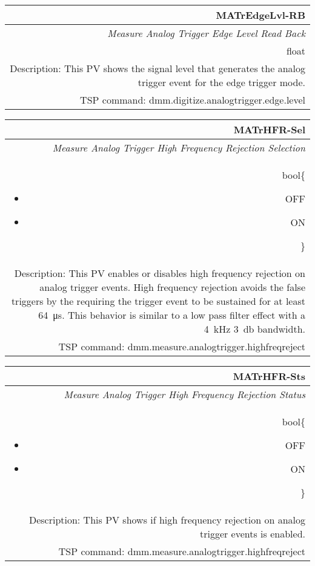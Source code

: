 \documentclass[openany]{article}
\begin{document}
		\begin{tabular}{N}
			\hline
			\bfseries MATrEdgeLvl-RB\label{pv:matredgelvl-rb} \\ \hline
			\emph{Measure Analog Trigger Edge Level Read Back} \\
			float \\
			Description: This PV shows the signal level that generates the analog trigger event for the edge trigger mode. \\
			TSP command: dmm.digitize.analogtrigger.edge.level
		\end{tabular}

		\begin{tabular}{N}
			\hline
			\bfseries MATrHFR-Sel\label{pv:matrhfr-sel} \\ \hline
			\emph{Measure Analog Trigger High Frequency Rejection Selection} \\
			bool\{\begin{itemize}[noitemsep]
				\small
				\item[] OFF
				\item[] ON
			\end{itemize}\} \\
			Description: This PV enables or disables high frequency rejection on analog trigger events. High frequency rejection avoids the false triggers by the requiring the trigger event to be sustained for at least \SI{64}{\micro\second}. This behavior is similar to a low pass filter effect with a \SI{4}{\kilo\hertz} \SI{3}{\decibel} bandwidth. \\
			TSP command: dmm.measure.analogtrigger.highfreqreject
		\end{tabular}

		\begin{tabular}{N}
			\hline
			\bfseries MATrHFR-Sts\label{pv:matrhfr-sts} \\ \hline
			\emph{Measure Analog Trigger High Frequency Rejection Status} \\
			bool\{\begin{itemize}[noitemsep]
				\small
				\item[] OFF
				\item[] ON
			\end{itemize}\} \\
			Description: This PV shows if high frequency rejection on analog trigger events is enabled. \\
			TSP command: dmm.measure.analogtrigger.highfreqreject
		\end{tabular}
\end{document}
